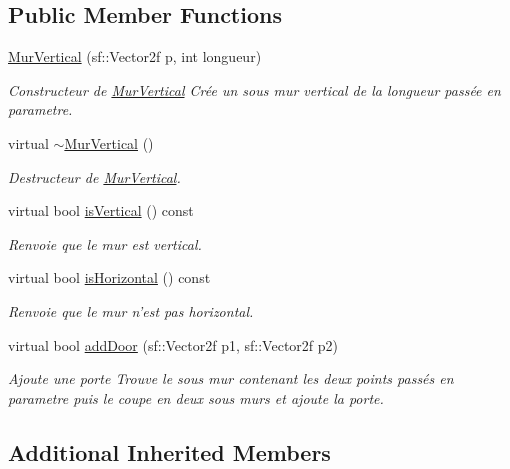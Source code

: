 \subsection*{Public Member Functions}
\begin{DoxyCompactItemize}
\item 
\hyperlink{classMurVertical_ad7a297ea8d571320c5680c815abcc4b4}{Mur\-Vertical} (sf\-::\-Vector2f p, int longueur)
\begin{DoxyCompactList}\small\item\em Constructeur de \hyperlink{classMurVertical}{Mur\-Vertical} Crée un sous mur vertical de la longueur passée en parametre. \end{DoxyCompactList}\item 
\hypertarget{classMurVertical_aa9cf071ed4a95823d29da370b196ef38}{virtual \hyperlink{classMurVertical_aa9cf071ed4a95823d29da370b196ef38}{$\sim$\-Mur\-Vertical} ()}\label{classMurVertical_aa9cf071ed4a95823d29da370b196ef38}

\begin{DoxyCompactList}\small\item\em Destructeur de \hyperlink{classMurVertical}{Mur\-Vertical}. \end{DoxyCompactList}\item 
virtual bool \hyperlink{classMurVertical_a4bf63e6e5a278e58948e7b60ea999978}{is\-Vertical} () const 
\begin{DoxyCompactList}\small\item\em Renvoie que le mur est vertical. \end{DoxyCompactList}\item 
virtual bool \hyperlink{classMurVertical_a26976af4fd4e338aa2c9287d144fa4b0}{is\-Horizontal} () const 
\begin{DoxyCompactList}\small\item\em Renvoie que le mur n'est pas horizontal. \end{DoxyCompactList}\item 
virtual bool \hyperlink{classMurVertical_ad3c625627616589dd53ec30c26e98b7d}{add\-Door} (sf\-::\-Vector2f p1, sf\-::\-Vector2f p2)
\begin{DoxyCompactList}\small\item\em Ajoute une porte Trouve le sous mur contenant les deux points passés en parametre puis le coupe en deux sous murs et ajoute la porte. \end{DoxyCompactList}\end{DoxyCompactItemize}
\subsection*{Additional Inherited Members}


